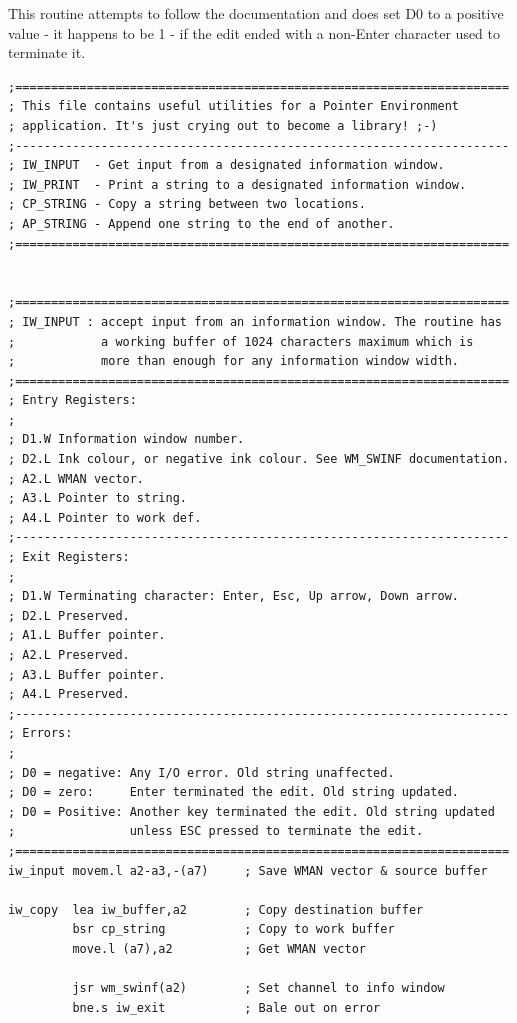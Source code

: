 This routine attempts to follow the documentation and does set D0 to
    a positive value -{} it happens to be 1 -{} if the edit ended with a non-{}Enter
    character used to terminate it.

\begin{lstlisting}[firstnumber=1,caption={QlToday\_pe\_utilities\_asm}]
;=====================================================================
; This file contains useful utilities for a Pointer Environment
; application. It's just crying out to become a library! ;-)
;---------------------------------------------------------------------
; IW_INPUT  - Get input from a designated information window.
; IW_PRINT  - Print a string to a designated information window.
; CP_STRING - Copy a string between two locations.
; AP_STRING - Append one string to the end of another.
;=====================================================================


;=====================================================================
; IW_INPUT : accept input from an information window. The routine has
;            a working buffer of 1024 characters maximum which is
;            more than enough for any information window width.
;=====================================================================
; Entry Registers:
;
; D1.W Information window number.
; D2.L Ink colour, or negative ink colour. See WM_SWINF documentation.
; A2.L WMAN vector.
; A3.L Pointer to string.
; A4.L Pointer to work def.
;---------------------------------------------------------------------
; Exit Registers:
;
; D1.W Terminating character: Enter, Esc, Up arrow, Down arrow.
; D2.L Preserved.
; A1.L Buffer pointer.
; A2.L Preserved.
; A3.L Buffer pointer.
; A4.L Preserved.
;---------------------------------------------------------------------
; Errors:
;
; D0 = negative: Any I/O error. Old string unaffected.
; D0 = zero:     Enter terminated the edit. Old string updated.
; D0 = Positive: Another key terminated the edit. Old string updated
;                unless ESC pressed to terminate the edit.
;=====================================================================
iw_input movem.l a2-a3,-(a7)     ; Save WMAN vector & source buffer

iw_copy  lea iw_buffer,a2        ; Copy destination buffer
         bsr cp_string           ; Copy to work buffer
         move.l (a7),a2          ; Get WMAN vector

         jsr wm_swinf(a2)        ; Set channel to info window
         bne.s iw_exit           ; Bale out on error


\end{lstlisting}

